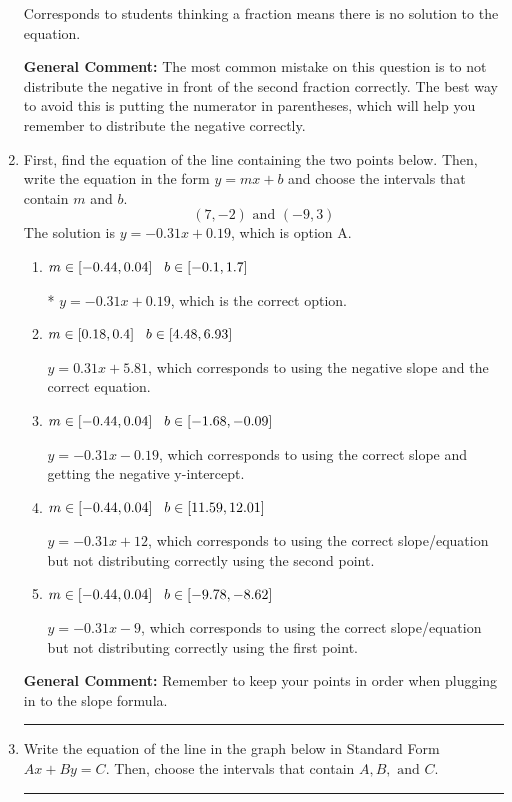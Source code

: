 \documentclass{extbook}[14pt]
\newcommand{\litem}[1]{\item #1

\rule{\textwidth}{0.4pt}}
\begin{document}
\begin{enumerate}
{\begin{enumerate}[label=\Alph*.]
Corresponds to students thinking a fraction means there is no solution to the equation.
\end{enumerate}

\textbf{General Comment:} The most common mistake on this question is to not distribute the negative in front of the second fraction correctly. The best way to avoid this is putting the numerator in parentheses, which will help you remember to distribute the negative correctly.
}
\litem{
First, find the equation of the line containing the two points below. Then, write the equation in the form $ y=mx+b $ and choose the intervals that contain $m$ and $b$.
\[ (7, -2) \text{ and } (-9, 3) \]The solution is \( y = -0.31x + 0.19 \), which is option A.\begin{enumerate}[label=\Alph*.]
\item \( m \in [-0.44, 0.04] \hspace*{3mm} b \in [-0.1, 1.7] \)

* $y = -0.31x + 0.19$, which is the correct option.
\item \( m \in [0.18, 0.4] \hspace*{3mm} b \in [4.48, 6.93] \)

 $y = 0.31x + 5.81$, which corresponds to using the negative slope and the correct equation.
\item \( m \in [-0.44, 0.04] \hspace*{3mm} b \in [-1.68, -0.09] \)

 $y = -0.31x -0.19$, which corresponds to using the correct slope and getting the negative y-intercept.
\item \( m \in [-0.44, 0.04] \hspace*{3mm} b \in [11.59, 12.01] \)

 $y = -0.31x + 12$, which corresponds to using the correct slope/equation but not distributing correctly using the second point.
\item \( m \in [-0.44, 0.04] \hspace*{3mm} b \in [-9.78, -8.62] \)

 $y = -0.31x -9$, which corresponds to using the correct slope/equation but not distributing correctly using the first point.
\end{enumerate}

\textbf{General Comment:} Remember to keep your points in order when plugging in to the slope formula.
}
\litem{
Write the equation of the line in the graph below in Standard Form $Ax+By=C$. Then, choose the intervals that contain $A, B, \text{ and } C$.

}
\end{enumerate}
\end{document}
